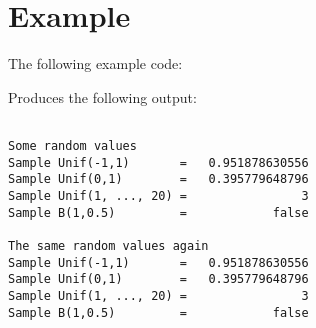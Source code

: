 \section{Example} \label{examples}

The following example code:

Produces the following output:
\begin{verbatim}

Some random values
Sample Unif(-1,1)       =   0.951878630556
Sample Unif(0,1)        =   0.395779648796
Sample Unif(1, ..., 20) =                3
Sample B(1,0.5)         =            false

The same random values again
Sample Unif(-1,1)       =   0.951878630556
Sample Unif(0,1)        =   0.395779648796
Sample Unif(1, ..., 20) =                3
Sample B(1,0.5)         =            false
\end{verbatim}
